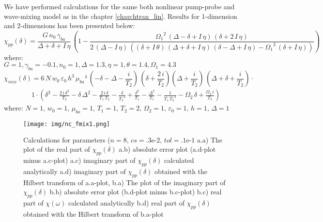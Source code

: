 \documentclass[12pt,twoside,a4paper]{article}
\numberwithin{equation}{subsection}
\numberwithin{figure}{subsection}
\begin{document}
We have performed calculations for the same both nonlinear pump-probe and wave-mixing model as in the chapter \ref{chap:htran_lin}.
Results for 1-dimension and 2-dimensions has been presented below:
\begin{equation} \label{eq:nc_chipp}
  {\chi_{pp}}(\delta ) = \frac {G\,{n_{0}}\,{\gamma_{ba}}}{\Delta  + \delta  + I\,\eta }\, \left(1 - \frac
  {{\Omega_{1}}^{2}\,(\Delta - \delta  + I\,\eta )\,(\delta  + 2\,I\,\eta )}{2\,(\Delta  - I\,\eta )\,((\delta  + I\,\theta
  )\,(\Delta  + \delta  + I\,\eta )\, (\delta  - \Delta  + I\,\eta ) - {\Omega_{1}}^{2}\,(\delta  + I\,\eta ))} \!  \right) 
\end{equation}
where: \\
$G=1, \gamma_{ba} = -0.1, n_{0} = 1, \Delta = 1.3, \eta = 1, \theta = 1.4, \Omega_{1}=4.3$ 
\begin{equation} \label{eq:nc_chimix}
  {\chi_{mix}}(\delta )= 6\,N\,{w_{0}}\,\varepsilon_0\,h^{3}\,{\mu_{\mathit{ba}}}^{4}
   \,( - \delta  - \Delta  - \frac {i}{{T_{2}}})
   \,(\delta  + \frac{2\,i}{{T_{2}}}) (\Delta  + \frac {i}{{T_{2}}})\,(\Delta  + \delta  + \frac
  {i}{{T_{2}}})\cdot
\end{equation}
\begin{alignat*}{1}
  \cdot	(\delta ^{3} - \frac {2\,i\,\delta ^{2}}{{T_{2}}} - \delta \,\Delta ^{2} - \frac {2\,i\,\delta }{{T_{1}}\,{T_{2}}}
  - \frac {\delta }{{T_{2}}^{2}} + \frac {\delta ^{2}}{{T_{1}}} - \frac {\Delta ^{2}}{{T_{1}}} - \frac {1}{{T_{1}}\,{T_{2}}^{2}} -
  {\Omega_{2}}\,\delta  + \frac {{\Omega_{2}}\,i}{{T_{2}}})
\end{alignat*}
where: $N=1, \,{w_{0}}=1, \,{\mu_{ba}}=1, \,{T_{1}}=1, \,{T_{2}}=2, \,{\Omega_{2}}=1, \,{\varepsilon_{0}}=1, \,h=1, \,\Delta =1$

\begin{figure} 
  \texttt{[image: img/nc\_fmix1.png]}
  \caption{Calculations for parameters ($n=8, \,cs=\mbox{.3e-2}, \,tol=\mbox{.1e-1}$
     a.a) The plot of the real part of ${\chi_{pp}}(\delta )$
     a.b) absolute error plot (a.d-plot minus a.c-plot) 
     a.c) imaginary part of ${\chi_{pp}}(\delta )$ calculated analytically 
     a.d) imaginary part of ${\chi_{pp}}(\delta )$ obtained with the Hilbert transform of a.a-plot, 
     b.a) The plot of the imaginary part of ${\chi_{pp}}(\delta )$ 
     b.b) absolute error plot (b.d-plot minus b.c-plot) 
     b.c) real part of $\chi (\omega )$ calculated analytically 
     b.d) real part of ${\chi_{pp}}(\delta )$ obtained with the Hilbert transform of b.a-plot 
     \label{nc_fmix1}
     }
\end{figure}
\end{document}

